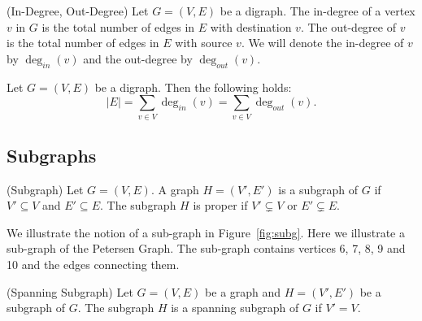 \begin{definition}{(In-Degree, Out-Degree)}
Let \(G = (V, E)\) be a digraph.
The in-degree of a vertex \(v\) in \(G\) is the total number of edges in \(E\) with destination \(v\).
The out-degree of \(v\) is the total number of edges in \(E\) with source \(v\).
We will denote the in-degree of \(v\) by \(\deg_{in}(v)\) and the out-degree by \(\deg_{out}(v)\).
\end{definition}

\begin{theorem}
Let \(G = (V, E)\) be a digraph.
Then the following holds:
\begin{equation}
|E| =\sum_{v\in V} \deg_{in}(v) =\sum_{v\in V} \deg_{out}(v).
\end{equation}
\end{theorem}

\subsection{Subgraphs}
%
\begin{definition}{(Subgraph)}
Let \(G = (V, E)\).
A graph \(H = (V', E')\) is a subgraph of \(G\) if \(V' \subseteq V\) and \(E'\subseteq E\).
The subgraph \(H\) is proper if \(V' \subsetneq V\) or \(E' \subsetneq E\).
\end{definition}
%
\begin{example}%
We illustrate the notion of a sub-graph in Figure~\ref{fig:subg}.
Here we illustrate a sub-graph of the Petersen Graph.
The sub-graph contains vertices 6, 7, 8, 9 and 10 and the edges connecting them.
\end{example}
%
\begin{definition}{(Spanning Subgraph)}
Let \(G = (V, E)\) be a graph and \(H = (V', E') \) be a subgraph of \(G\).
The subgraph \(H\) is a spanning subgraph of \(G\) if \(V' = V\).
\end{definition}

